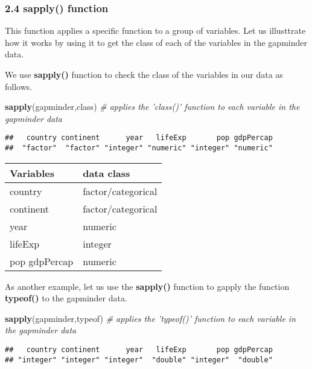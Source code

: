 \documentclass[]{article}
\newenvironment{Shaded}{\begin{snugshade}}{\end{snugshade}}
\newcommand{\KeywordTok}[1]{\textcolor[rgb]{0.13,0.29,0.53}{\textbf{{#1}}}}
\newcommand{\CommentTok}[1]{\textcolor[rgb]{0.56,0.35,0.01}{\textit{{#1}}}}
\newcommand{\NormalTok}[1]{{#1}}
\begin{document}
\subsubsection{\texorpdfstring{2.4 \textbf{sapply()}
function}{2.4 sapply() function}}\label{sapply-function}

This function applies a specific function to a group of variables. Let
us illusttrate how it works by using it to get the class of each of the
variables in the gapminder data.

We use \textbf{sapply()} function to check the class of the variables in
our data as follows.

\begin{Shaded}
\begin{Highlighting}[]
\KeywordTok{sapply}\NormalTok{(gapminder,class) }\CommentTok{# applies the 'class()' function to each variable in the gapminder data}
\end{Highlighting}
\end{Shaded}

\begin{verbatim}
##   country continent      year   lifeExp       pop gdpPercap 
##  "factor"  "factor" "integer" "numeric" "integer" "numeric"
\end{verbatim}

\begin{longtable}[]{@{}ll@{}}
\toprule
Variables & data class\tabularnewline
\midrule
\endhead
country & factor/categorical\tabularnewline
continent & factor/categorical\tabularnewline
year & numeric\tabularnewline
lifeExp & integer\tabularnewline
pop gdpPercap & numeric\tabularnewline
\bottomrule
\end{longtable}

As another example, let us use the \textbf{sapply()} function to gapply
the function \textbf{typeof()} to the gapminder data.

\begin{Shaded}
\begin{Highlighting}[]
\KeywordTok{sapply}\NormalTok{(gapminder,typeof) }\CommentTok{# applies the 'typeof()' function to each variable in the gapminder data}
\end{Highlighting}
\end{Shaded}

\begin{verbatim}
##   country continent      year   lifeExp       pop gdpPercap 
## "integer" "integer" "integer"  "double" "integer"  "double"
\end{verbatim}
\end{document}
